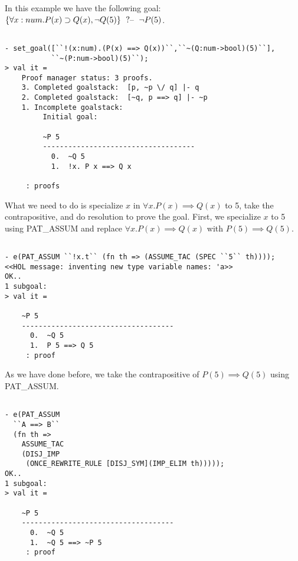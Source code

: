 In this example we have the following goal: $\{\forall x:num.P(x)
  \supset Q(x), \neg Q(5)\}\;\text{ ?-- }\;{\neg P(5)}$.
\begin{session}
  \begin{scriptsize}
\begin{verbatim}

- set_goal([``!(x:num).(P(x) ==> Q(x))``,``~(Q:num->bool)(5)``], 
           ``~(P:num->bool)(5)``);
> val it =
    Proof manager status: 3 proofs.
    3. Completed goalstack:  [p, ~p \/ q] |- q
    2. Completed goalstack:  [~q, p ==> q] |- ~p
    1. Incomplete goalstack:
         Initial goal:
         
         ~P 5
         ------------------------------------
           0.  ~Q 5
           1.  !x. P x ==> Q x
         
     : proofs
\end{verbatim}
  \end{scriptsize}
\end{session}
What we need to do is specialize $x$ in $\forall x.P(x) \implies Q(x)$
to 5, take the contrapositive, and do resolution to prove the
goal. First, we specialize $x$ to 5 using PAT\_ASSUM and replace
$\forall x.P(x) \implies Q(x)$ with $P(5) \implies Q(5)$.
\begin{session}
  \begin{scriptsize}
\begin{verbatim}

- e(PAT_ASSUM ``!x.t`` (fn th => (ASSUME_TAC (SPEC ``5`` th))));
<<HOL message: inventing new type variable names: 'a>>
OK..
1 subgoal:
> val it =
    
    ~P 5
    ------------------------------------
      0.  ~Q 5
      1.  P 5 ==> Q 5
     : proof
\end{verbatim}
  \end{scriptsize}
\end{session}
As we have done before, we take the contrapositive of $P(5) \implies
Q(5)$ using PAT\_ASSUM.
\begin{session}
  \begin{scriptsize}
\begin{verbatim}

- e(PAT_ASSUM 
  ``A ==> B`` 
  (fn th => 
    ASSUME_TAC 
    (DISJ_IMP 
     (ONCE_REWRITE_RULE [DISJ_SYM](IMP_ELIM th)))));
OK..
1 subgoal:
> val it =
    
    ~P 5
    ------------------------------------
      0.  ~Q 5
      1.  ~Q 5 ==> ~P 5
     : proof
\end{verbatim}
  \end{scriptsize}
\end{session}
